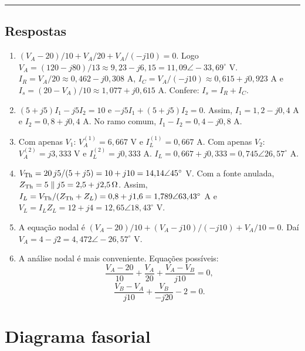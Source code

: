 \documentclass[12pt,a4paper]{article}
\newcommand{\gabarito}{\vspace{0.6em}\hrule\vspace{0.5em}\subsection*{Respostas}\vspace{-0.3em}}
\begin{document}
\gabarito

\begin{enumerate}[label=\textbf{3.\arabic*.}]
\item $(V_A-20)/10+V_A/20+V_A/(-j10)=0$. Logo $V_A=(120-j80)/13\approx9{,}23-j6{,}15=11{,}09\angle-33{,}69^\circ$ V. $I_R=V_A/20\approx0{,}462-j0{,}308$ A, $I_C=V_A/(-j10)\approx0{,}615+j0{,}923$ A e $I_s=(20-V_A)/10\approx1{,}077+j0{,}615$ A. Confere: $I_s=I_R+I_C$.
\item $(5+j5)I_1-j5I_2=10$ e $-j5I_1+(5+j5)I_2=0$. Assim, $I_1=1{,}2-j0{,}4$ A e $I_2=0{,}8+j0{,}4$ A. No ramo comum, $I_1-I_2=0{,}4-j0{,}8$ A.
\item Com apenas $V_1$: $V_A^{(1)}=6{,}667$ V e $I_L^{(1)}=0{,}667$ A. Com apenas $V_2$: $V_A^{(2)}=j3{,}333$ V e $I_L^{(2)}=j0{,}333$ A. $I_L=0{,}667+j0{,}333=0{,}745\angle26{,}57^\circ$ A.
\item $V_{\rm Th}=20\,j5/(5+j5)=10+j10=14{,}14\angle45^\circ$ V. Com a fonte anulada, $Z_{\rm Th}=5\parallel j5=2{,}5+j2{,}5\,\Omega$. Assim, $I_L=V_{\rm Th}/(Z_{\rm Th}+Z_L)=0{,}8+j1{,}6=1{,}789\angle63{,}43^\circ$ A e $V_L=I_LZ_L=12+j4=12{,}65\angle18{,}43^\circ$ V.
\item A equação nodal é $(V_A-20)/10+(V_A-j10)/(-j10)+V_A/10=0$. Daí $V_A=4-j2=4{,}472\angle-26{,}57^\circ$ V.
\item A análise nodal é mais conveniente. Equações possíveis:
\[
\frac{V_A-20}{10}+\frac{V_A}{20}+\frac{V_A-V_B}{j10}=0,
\]
\[
\frac{V_B-V_A}{j10}+\frac{V_B}{-j20}-2=0.
\]
\end{enumerate}

\newpage
\section{Diagrama fasorial}
\end{document}
